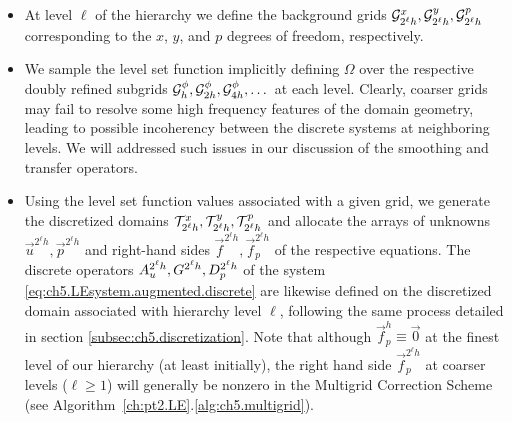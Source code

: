 \begin{itemize}

\item At level $\ell$ of the hierarchy we define the background grids $\mathcal{G}^x_{2^{\ell}h}, \mathcal{G}^y_{2^{\ell}h}, \mathcal{G}^p_{2^{\ell}h}$ corresponding to the $x$, $y$, and $p$ degrees of freedom, respectively.

\item We sample the level set function implicitly defining $\Omega$ over the respective doubly refined subgrids $\mathcal{G}^\phi_h, \mathcal{G}^\phi_{2h}, \mathcal{G}^\phi_{4h}, \dotsc$ at each level. Clearly, coarser grids may fail to resolve some high frequency features of the domain geometry, leading to possible incoherency between the discrete systems at neighboring levels. We will addressed such issues in our discussion of the smoothing and transfer operators.

\item Using the level set function values associated with a given grid, we generate the discretized domains $\mathcal{T}^x_{2^{\ell}h}, \mathcal{T}^y_{2^{\ell}h}, \mathcal{T}^p_{2^{\ell}h}$ and allocate the arrays of unknowns $\vec{u}^{2^{\ell}h}, \vec{p}^{2^{\ell}h}$ and right-hand sides $\vec{f}^{2^{\ell}h}, \vec{f}_p^{2^{\ell}h}$ of the respective equations. The discrete operators $A_u^{2^{\ell}h}, \linebreak[0] G^{2^{\ell}h}, \linebreak[0] D_p^{2^{\ell}h}$ of the system \eqref{eq:ch5.LEsystem.augmented.discrete} are likewise defined on the discretized domain associated with hierarchy level $\ell$, following the same process detailed in section \ref{subsec:ch5.discretization}. Note that although $\vec{f}_p^h \equiv \vec{0}$ at the finest level of our hierarchy (at least initially), the right hand side $\vec{f}_p^{2^{\ell}h}$ at coarser levels ($\ell \geq 1$) will generally be nonzero in the Multigrid Correction Scheme (see Algorithm~\ref{ch:pt2.LE}.\ref{alg:ch5.multigrid}).

\end{itemize}

